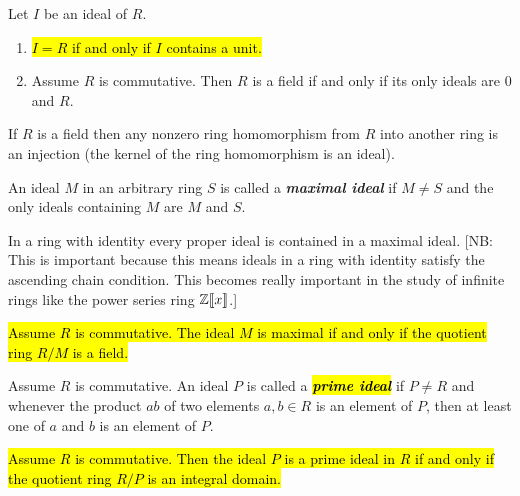 \nl

\begin{prop}
Let $I$ be an ideal of $R$.
\begin{enumerate}
\item \hl{$I = R$ if and only if $I$ contains a unit.}
\item Assume $R$ is commutative. Then $R$ is a field if and only if its only ideals are $0$ and $R$.
\end{enumerate}
\end{prop}

\nl

\begin{cor}
If $R$ is a field then any nonzero ring homomorphism from $R$ into another ring is an injection (the kernel of the ring homomorphism is an ideal).
\end{cor}

\nl

\begin{defn}
An ideal $M$ in an arbitrary ring $S$ is called a \textbf{\textit{maximal ideal}} if $M\neq S$ and the only ideals containing $M$ are $M$ and $S$.
\end{defn}

\nl

\begin{prop}
In a ring with identity every proper ideal is contained in a maximal ideal. [NB: This is important because this means ideals in a ring with identity satisfy the ascending chain condition. This becomes really important in the study of infinite rings like the power series ring $\mathbb{Z}\llbracket x\rrbracket$.]
\end{prop}

\nl

\begin{prop}
\hl{Assume $R$ is commutative. The ideal $M$ is maximal if and only if the quotient ring $R/M$ is a field.}
\end{prop}

\nl

\begin{defn}
Assume $R$ is commutative. An ideal $P$ is called a \hl{\textit{\textbf{prime ideal}}} if $P\neq R$ and whenever the product $ab$ of two elements $a,b\in R$ is an element of $P$, then at least one of $a$ and $b$ is an element of $P$.
\end{defn}

\nl

\begin{prop}
\hl{Assume $R$ is commutative. Then the ideal $P$ is a prime ideal in $R$ if and only if the quotient ring $R/P$ is an integral domain.}
\end{prop}

